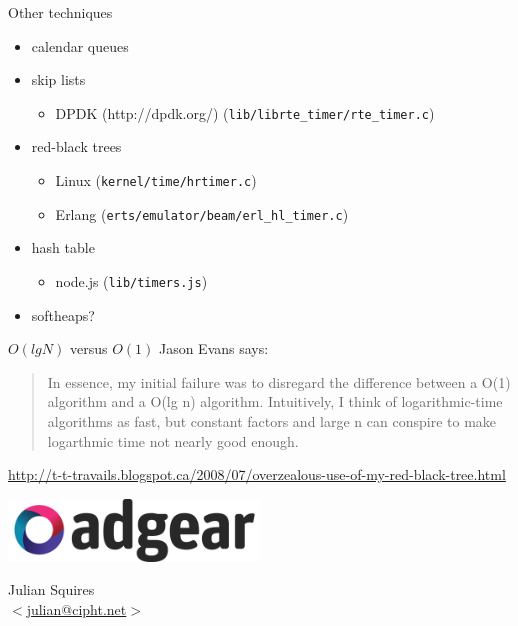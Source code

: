 \documentclass{beamer}
\begin{document}


\begin{frame}{Other techniques}
  \begin{itemize}
  \item calendar queues
  \item skip lists
    \begin{itemize}
    \item DPDK (http://dpdk.org/)
      (\texttt{lib/librte\_timer/rte\_timer.c})
    \end{itemize}
  \item red-black trees
    \begin{itemize}
    \item Linux (\texttt{kernel/time/hrtimer.c})
    \item Erlang (\texttt{erts/emulator/beam/erl\_hl\_timer.c})
    \end{itemize}
  \item hash table
    \begin{itemize}
    \item node.js (\texttt{lib/timers.js})
    \end{itemize}
  \item softheaps?
  \end{itemize}
\end{frame}

\begin{frame}{$O( lg N)$ versus $O(1)$}
Jason Evans says:

\begin{quotation}
In essence, my initial failure was to disregard the difference between
a O(1) algorithm and a O(lg n) algorithm. Intuitively, I think of
logarithmic-time algorithms as fast, but constant factors and large n
can conspire to make logarthmic time not nearly good enough.
\end{quotation}

\hyperlink{http://t-t-travails.blogspot.ca/2008/07/overzealous-use-of-my-red-black-tree.html}{http://t-t-travails.blogspot.ca/2008/07/overzealous-use-of-my-red-black-tree.html}

\end{frame}

\begin{frame}
  \begin{center}
    \includegraphics[width=0.5\textwidth]{logo_adgear_smaller.png}
  \end{center}

  \vspace{3em}
  \begin{center}
    Julian Squires \\
    \hyperlink{mailto:julian@cipht.net}{$<$julian@cipht.net$>$}
  \end{center}
\end{frame}
\end{document}
